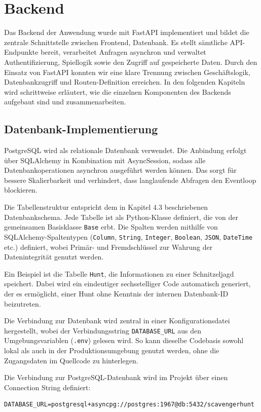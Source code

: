\documentclass[oneside]{ausarbeitung}
\begin{document}
\section{Backend}

Das Backend der Anwendung wurde mit FastAPI implementiert und bildet die zentrale Schnittstelle zwischen Frontend, Datenbank.
Es stellt sämtliche API-Endpunkte bereit, verarbeitet Anfragen asynchron und verwaltet Authentifizierung, Spiellogik sowie den Zugriff auf gespeicherte Daten.
Durch den Einsatz von FastAPI konnten wir eine klare Trennung zwischen Geschäftslogik, Datenbankzugriff und Routen-Definition erreichen.
In den folgenden Kapiteln wird schrittweise erläutert, wie die einzelnen Komponenten des Backends aufgebaut sind und zusammenarbeiten.

\subsection{Datenbank-Implementierung}
PostgreSQL wird als relationale Datenbank verwendet.
Die Anbindung erfolgt über SQLAlchemy in Kombination mit AsyncSession, sodass alle Datenbankoperationen asynchron ausgeführt werden können.
Das sorgt für bessere Skalierbarkeit und verhindert, dass langlaufende Abfragen den Eventloop blockieren.

Die Tabellenstruktur entspricht dem in Kapitel 4.3 beschriebenen Datenbankschema.
Jede Tabelle ist als Python-Klasse definiert, die von der gemeinsamen Basisklasse \texttt{Base} erbt.
Die Spalten werden mithilfe von SQLAlchemy-Spaltentypen (\texttt{Column}, \texttt{String}, \texttt{Integer}, \texttt{Boolean}, \texttt{JSON}, \texttt{DateTime} etc.) definiert,
wobei Primär- und Fremdschlüssel zur Wahrung der Datenintegrität genutzt werden.

Ein Beispiel ist die Tabelle \texttt{Hunt}, die Informationen zu einer Schnitzeljagd speichert.
Dabei wird ein eindeutiger sechsstelliger Code automatisch generiert, der es ermöglicht, einer Hunt ohne Kenntnis der internen Datenbank-ID beizutreten.

Die Verbindung zur Datenbank wird zentral in einer Konfigurationsdatei hergestellt,
wobei der Verbindungsstring \texttt{DATABASE\_URL} aus den Umgebungsvariablen (\texttt{.env}) gelesen wird.
So kann dieselbe Codebasis sowohl lokal als auch in der Produktionsumgebung genutzt werden, ohne die Zugangsdaten im Quellcode zu hinterlegen.

Die Verbindung zur PostgreSQL-Datenbank wird im Projekt über einen Connection String definiert:
\begin{verbatim}
DATABASE_URL=postgresql+asyncpg://postgres:1967@db:5432/scavengerhunt
\end{verbatim}
\end{document}
